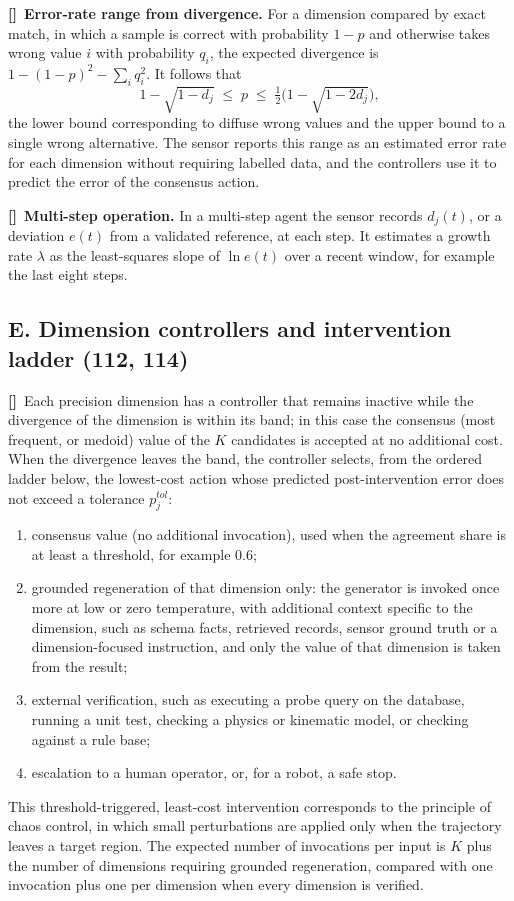 \documentclass[12pt,a4paper]{article}
\newcounter{para}
\newcommand{\p}{\refstepcounter{para}\textbf{[\thepara]}\ }
\begin{document}
\p \textbf{Error-rate range from divergence.} For a dimension compared by exact match, in which a sample is correct with probability $1-p$ and otherwise takes wrong value $i$ with probability $q_i$, the expected divergence is $1-(1-p)^2-\sum_i q_i^2$. It follows that
\[
1-\sqrt{1-d_j}\;\le\;p\;\le\;\tfrac12\Big(1-\sqrt{1-2d_j}\Big),
\]
the lower bound corresponding to diffuse wrong values and the upper bound to a single wrong alternative. The sensor reports this range as an estimated error rate for each dimension without requiring labelled data, and the controllers use it to predict the error of the consensus action.

\p \textbf{Multi-step operation.} In a multi-step agent the sensor records $d_j(t)$, or a deviation $e(t)$ from a validated reference, at each step. It estimates a growth rate $\lambda$ as the least-squares slope of $\ln e(t)$ over a recent window, for example the last eight steps.

\subsection*{E. Dimension controllers and intervention ladder (112, 114)}

\p Each precision dimension has a controller that remains inactive while the divergence of the dimension is within its band; in this case the consensus (most frequent, or medoid) value of the $K$ candidates is accepted at no additional cost. When the divergence leaves the band, the controller selects, from the ordered ladder below, the lowest-cost action whose predicted post-intervention error does not exceed a tolerance $p_j^{tol}$:
\begin{enumerate}[label=(\alph*)]
\item consensus value (no additional invocation), used when the agreement share is at least a threshold, for example 0.6;
\item grounded regeneration of that dimension only: the generator is invoked once more at low or zero temperature, with additional context specific to the dimension, such as schema facts, retrieved records, sensor ground truth or a dimension-focused instruction, and only the value of that dimension is taken from the result;
\item external verification, such as executing a probe query on the database, running a unit test, checking a physics or kinematic model, or checking against a rule base;
\item escalation to a human operator, or, for a robot, a safe stop.
\end{enumerate}
This threshold-triggered, least-cost intervention corresponds to the principle of chaos control, in which small perturbations are applied only when the trajectory leaves a target region. The expected number of invocations per input is $K$ plus the number of dimensions requiring grounded regeneration, compared with one invocation plus one per dimension when every dimension is verified.
\end{document}

